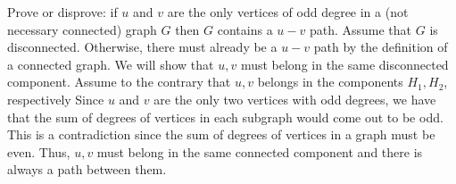 \begin{hwproblem}{5}{
    Prove or disprove: if $u$ and $v$ are the only vertices of odd
    degree in a (not necessary connected) graph $G$ then $G$ contains a $u-v$ 
    path.
  }
  Assume that \(G\) is disconnected. Otherwise, there must already be a
  \(u-v\) path by the definition of a connected graph. We will show that \(u,
  v\) must belong in the same disconnected component. Assume to the contrary
  that \(u, v\) belongs in the components \(H_1, H_2\), respectively
  Since \(u\) and \(v\) are the only two vertices with odd degrees, we have 
  that the sum of degrees of vertices in each subgraph would come out to be odd.
  This is a contradiction since the sum of degrees of vertices in a graph must
  be even. Thus, \(u, v\) must belong in the same connected component and there
  is always a path between them.
\end{hwproblem}

